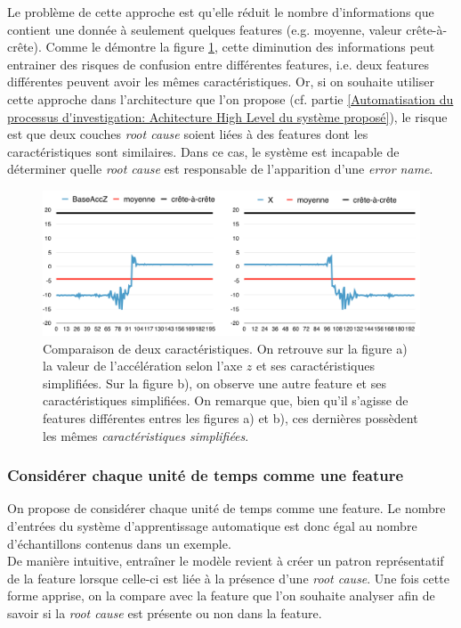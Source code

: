 Le problème de cette approche est qu'elle réduit le nombre d'informations que contient une donnée à seulement quelques features (e.g. moyenne, valeur crête-à-crête). Comme le démontre la figure \ref{fig:Comparaison de deux caractéristiques}, cette diminution des informations peut entrainer des risques de confusion entre différentes features, i.e. deux features différentes peuvent avoir les mêmes caractéristiques. Or, si on souhaite utiliser cette approche dans l'architecture que l'on propose (cf. partie \ref{Automatisation du processus d'investigation: Achitecture High Level du système proposé}), le risque est que deux couches \emph{root cause} soient liées à des features dont les caractéristiques sont similaires. Dans ce cas, le système est incapable de déterminer quelle \emph{root cause} est responsable de l'apparition d'une \emph{error name}.

\begin{figure}[H]
	\centering\includegraphics[width=15cm]{images/caracteristiques_simples_2.png}
	\caption[Comparaison de deux caractéristiques]{Comparaison de deux caractéristiques. On retrouve sur la figure a) la valeur de l'accélération selon l'axe $z$ et ses caractéristiques simplifiées. Sur la figure b), on observe une autre feature et ses caractéristiques simplifiées. On remarque que, bien qu'il s'agisse de features différentes entres les figures a) et b), ces dernières possèdent les mêmes \emph{caractéristiques simplifiées}.}
	\label{fig:Comparaison de deux caractéristiques}
\end{figure}

\subsubsection{Considérer chaque unité de temps comme une feature}
\label{Automatisation du processus d'investigation: Reconnaissance de motifs: Différentes approches étudiées: Considérer chaque unité de temps comme une feature}
On propose de considérer chaque unité de temps comme une feature. Le nombre d'entrées du système d'apprentissage automatique est donc égal au nombre d'échantillons contenus dans un exemple. \\
De manière intuitive, entraîner le modèle revient à créer un patron représentatif de la feature lorsque celle-ci est liée à la présence d'une \emph{root cause}. Une fois cette forme apprise, on la compare avec la feature que l'on souhaite analyser afin de savoir si la \emph{root cause} est présente ou non dans la feature.
\newline

